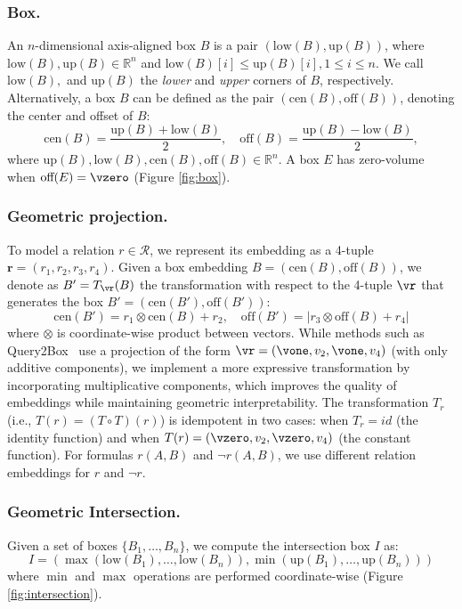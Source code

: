 \documentclass[runningheads]{llncs}
\newcommand{\lowc}[1]{\mbox{low}({#1})}
\newcommand{\upc}[1]{\mbox{up}({#1})}
\newcommand{\cen}[1]{\mbox{cen}({#1})}
\newcommand{\off}[1]{\mbox{off}({#1})}
\newcommand{\relemb}[1]{\ensuremath{\bm{#1} = (#1_1, #1_2, #1_3, #1_4)}}
\renewcommand{\paragraph}[1]{\subsubsection{#1}}
\begin{document}
\paragraph{Box.} An $n$-dimensional axis-aligned box $B$ is a pair
$(\lowc{B}, \upc{B})$, where $\lowc{B}, \upc{B} \in \mathbb{R}^n$ and
$\lowc{B}[i] \leq \upc{B}[i], 1\leq i \leq n$. We call $\lowc{B}, $
and $\upc{B}$ the \emph{lower} and \emph{upper} corners of $B$,
respectively. Alternatively, a box $B$ can be defined as the pair
$(\cen{B}, \off{B})$, denoting the center and offset of $B$:
\begin{equation}
  \label{eq:box}
  \cen{B} = \frac{\upc{B}+\lowc{B}}{2}, \quad   \off{B} = \frac{\upc{B}-\lowc{B}}{2},
\end{equation}
where $\upc{B}, \lowc{B}, \cen{B}, \off{B} \in \mathbb{R}^n$. A box
$E$ has zero-volume when $\off{E}=\vzero$ (Figure \ref{fig:box}).



\paragraph{Geometric projection.} To model a relation
$r \in \mathcal{R}$, we represent its embedding as a 4-tuple
$\relemb{r}$. Given a box embedding $B=(\cen{B}, \off{B})$, we denote
as $B' = T_\vr(B)$ the transformation with respect to the 4-tuple
$\vr$ that generates the box $B'=(\cen{B'}, \off{B'})$:
\begin{equation}
  \label{eq:projection}
  \cen{B'} = r_1\otimes \cen{B} + r_2, \quad \off{B'} = |r_3 \otimes \off{B} + r_4|
\end{equation}
where $\otimes$ is coordinate-wise product between vectors. While
methods such as Query2Box~\cite{query2box} use a projection of the
form $\vr = (\vone, v_2, \vone, v_4)$ (with only additive components),
we implement a more expressive transformation by incorporating
multiplicative components, which improves the quality of embeddings
while maintaining geometric interpretability. The transformation $T_r$
(i.e., $T(r) = (T \circ T)(r)$) is idempotent in two cases: when
$T_r = id$ (the identity function) and when
$T(r)=(\vzero, v_2, \vzero, v_4)$ (the constant function).  For
formulas $r(A,B)$ and $\neg r(A,B)$, we use different relation
embeddings for $r$ and $\neg r$.


\paragraph{Geometric Intersection.} Given a set of boxes
$\{B_1, \ldots, B_n\}$, we compute the intersection box $I$ as:
\begin{equation}
  \label{eq:intersection}
  I = (\max(\lowc{B_1},\ldots, \lowc{B_n}), \min(\upc{B_1},\ldots, \upc{B_n}))
\end{equation}
where $\min$ and $\max$ operations are performed coordinate-wise
(Figure \ref{fig:intersection}).
\end{document}
